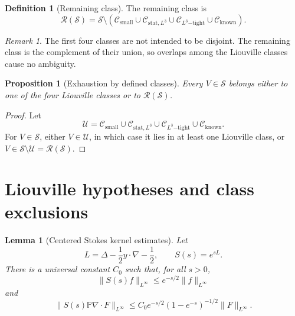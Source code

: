 \documentclass[11pt]{amsart}
\theoremstyle{plain}
\newtheorem{proposition}[theorem]{Proposition}
\newtheorem{lemma}[theorem]{Lemma}
\theoremstyle{definition}
\newtheorem{definition}[theorem]{Definition}
\theoremstyle{remark}
\newtheorem{remark}[theorem]{Remark}
\numberwithin{equation}{section}
\newcommand{\calS}{\mathcal S}
\newcommand{\calR}{\mathcal R}
\newcommand{\calC}{\mathcal C}
\newcommand{\calU}{\mathcal U}
\begin{document}
\begin{definition}[Remaining class]\label{def:remaining-class}
The remaining class is
\[
   \calR(\calS)
   =
   \calS
   \setminus
   \left(
      \calC_{\mathrm{small}}
      \cup
      \calC_{\mathrm{stat},L^3}
      \cup
      \calC_{L^3\mathrm{-tight}}
      \cup
      \calC_{\mathrm{known}}
   \right).
\]
\end{definition}

\begin{remark}
The first four classes are not intended to be disjoint.  The remaining class is
the complement of their union, so overlaps among the Liouville classes cause no
ambiguity.
\end{remark}

\begin{proposition}[Exhaustion by defined classes]\label{prop:exhaustion}
Every \(V\in\calS\) belongs either to one of the four Liouville classes or to
\(\calR(\calS)\).
\end{proposition}

\begin{proof}
Let
\[
   \calU=
      \calC_{\mathrm{small}}
      \cup
      \calC_{\mathrm{stat},L^3}
      \cup
      \calC_{L^3\mathrm{-tight}}
      \cup
      \calC_{\mathrm{known}}.
\]
For \(V\in\calS\), either \(V\in\calU\), in which case it lies in at least one
Liouville class, or \(V\in\calS\setminus\calU=\calR(\calS)\).
\end{proof}

\section{Liouville hypotheses and class exclusions}\label{sec:liouville}

\begin{lemma}[Centered Stokes kernel estimates]
\label{lem:centered-stokes-estimates}
Let
\[
   L=\Delta-\frac12y\cdot\nabla-\frac12,
   \qquad S(s)=e^{sL}.
\]
There is a universal constant \(C_0\) such that, for all \(s>0\),
\[
   \|S(s)f\|_{L^\infty}\le e^{-s/2}\|f\|_{L^\infty}
\]
and
\[
   \|S(s)\mathbb P\nabla\cdot F\|_{L^\infty}
   \le C_0 e^{-s/2}(1-e^{-s})^{-1/2}\|F\|_{L^\infty}.
\]
\end{lemma}
\end{document}
